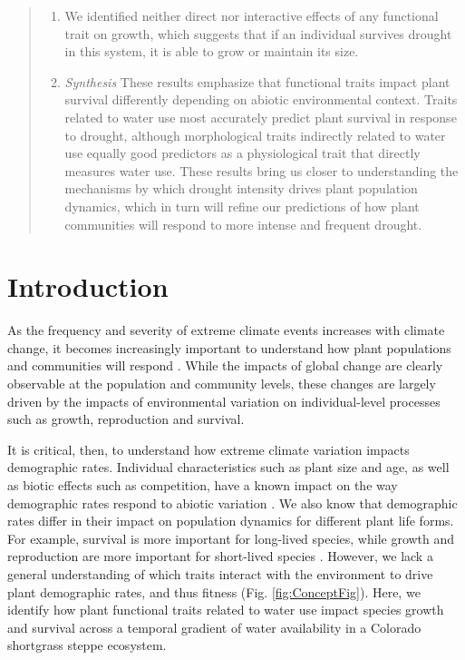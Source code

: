 \documentclass[12pt, letterpaper]{article}
\begin{document}
\begin{abstract}
\begin{enumerate}
\item  We identified neither direct nor interactive effects of any functional trait on growth, which suggests that if an individual survives drought in this system, it is able to grow or maintain its size.   %
\item \textit{Synthesis} These results emphasize that functional traits impact plant survival differently depending on abiotic environmental context. Traits related to water use most accurately predict plant survival in response to drought, although morphological traits indirectly related to water use equally good predictors as a physiological trait that directly measures water use. These results bring us closer to understanding the mechanisms by which drought intensity drives plant population dynamics, which in turn will refine our predictions of how plant communities will respond to more intense and frequent drought.
\end{enumerate}
\end{abstract}

\section{Introduction}
As the frequency and severity of extreme climate events increases with climate change, it becomes increasingly important to understand how plant populations and communities will respond \citep{Vicente-Serrano2020AWarming, Hartmann2013}. While the impacts of global change are clearly observable at the population and community levels, these changes are largely driven by the impacts of environmental variation on individual-level processes such as growth, reproduction and survival.  %

It is critical, then, to understand how extreme climate variation impacts demographic rates.  Individual characteristics such as plant size and age, as well as biotic effects such as competition, have a known impact on the way demographic rates respond to abiotic variation \citep{Adler2012, Tredennick2018}. We also know that demographic rates differ in their impact on population dynamics for different plant life forms. For example,  survival is more important for long-lived species, while growth and reproduction are more important for short-lived species \citep{Adler2014}. However, we lack a general understanding of which traits interact with the environment to drive plant demographic rates, and thus fitness \citep{Laughlin2018}(Fig. \ref{fig:ConceptFig}). Here, we identify how plant functional traits related to water use impact species growth and survival across a temporal gradient of water availability in a Colorado shortgrass steppe ecosystem. 
\end{document}
